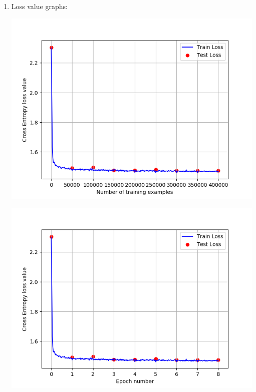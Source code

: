 \documentclass[a4paper]{iacas}
\begin{document}
\begin{enumerate}
\item Loss value graphs:

\vskip 0.1in
\begin{minipage}{\linewidth}
	\includegraphics[scale=0.8]{hw2_py/results/_14_01_43/lr_0_01_net_1_CE_/loss_value.png}
	\label{fig_1}
\end{minipage}
\vskip 0.1in
\begin{minipage}{\linewidth}
	\includegraphics[scale=0.8]{hw2_py/results/_14_01_43/lr_0_01_net_1_CE_/loss_value_epoch.png}
	\label{fig_2}
\end{minipage}
\vskip 0.1in



\end{enumerate}
\end{document}
